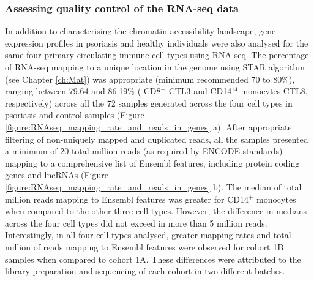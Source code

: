 \subsubsection{Assessing quality control of the RNA-seq data}
In addition to characterising the chromatin accessibility landscape, gene expression profiles in psoriasis and healthy individuals were also analysed for the same four primary circulating immune cell types using RNA-seq. The percentage of RNA-seq mapping to a unique location in the genome using STAR algorithm (see Chapter \ref{ch:Mat}) was appropriate (minimum recommended 70 to 80\%), ranging between 79.64 and 86.19\% ( CD8$^+$ CTL3 and CD14$^14$ monocytes CTL8, respectively) across all the 72 samples generated across the four cell types in psoriasis and control samples (Figure \ref{figure:RNAseq_mapping_rate_and_reads_in_genes} a). After appropriate filtering of non-uniquely mapped and duplicated reads, all the samples presented a minimum of 20 total million reads (as required by ENCODE standards) mapping to a comprehensive list of Ensembl features, including protein coding genes and lncRNAs (Figure \ref{figure:RNAseq_mapping_rate_and_reads_in_genes} b). The median of total million reads mapping to Ensembl features was greater for CD14$^+$ monocytes when compared to the other three cell types. However, the difference in medians across the four cell types did not exceed in more than 5 million reads. Interestingly, in all four cell types analysed, greater mapping rates and total million of reads mapping to Ensembl features were observed for cohort 1B samples when compared to cohort 1A. These differences were attributed to the library preparation and sequencing of each cohort in two different batches.  

